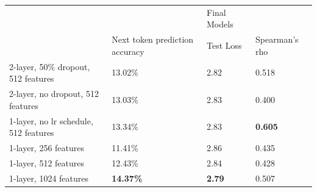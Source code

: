\begin{table}[!ht]
\begin{tabular}{|l|lll|}
\hline
                                      &                                                     & Final Models                       &                \\ \cline{2-4} 
                                      & \multicolumn{1}{l|}{Next token prediction accuracy} & \multicolumn{1}{l|}{Test Loss}     & Spearman's rho \\ \hline
2-layer, 50\% dropout, 512 features   & \multicolumn{1}{l|}{13.02\%}                        & \multicolumn{1}{l|}{2.82}          & 0.518          \\ \hline
2-layer, no dropout, 512 features     & \multicolumn{1}{l|}{13.03\%}                        & \multicolumn{1}{l|}{2.83}          & 0.400          \\ \hline
1-layer, no lr schedule, 512 features & \multicolumn{1}{l|}{13.34\%}                        & \multicolumn{1}{l|}{2.83}          & \textbf{0.605} \\ \hline
1-layer, 256 features                 & \multicolumn{1}{l|}{11.41\%}                        & \multicolumn{1}{l|}{2.86}          & 0.435          \\ \hline
1-layer, 512 features                 & \multicolumn{1}{l|}{12.43\%}                        & \multicolumn{1}{l|}{2.84}          & 0.428          \\ \hline
1-layer, 1024 features                & \multicolumn{1}{l|}{\textbf{14.37\%}}               & \multicolumn{1}{l|}{\textbf{2.79}} & 0.507          \\ \hline
\end{tabular}
\end{table}
